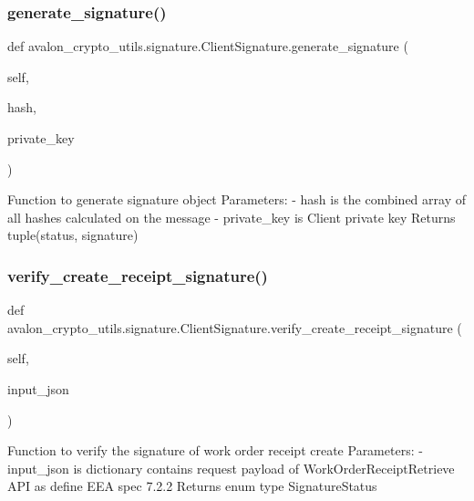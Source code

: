 \subsubsection{\texorpdfstring{generate\+\_\+signature()}{generate\_signature()}}
{\footnotesize\ttfamily def avalon\+\_\+crypto\+\_\+utils.\+signature.\+Client\+Signature.\+generate\+\_\+signature (\begin{DoxyParamCaption}\item[{}]{self,  }\item[{}]{hash,  }\item[{}]{private\+\_\+key }\end{DoxyParamCaption})}

\begin{DoxyVerb}Function to generate signature object
Parameters:
    - hash is the combined array of all hashes calculated on the
      message
    - private_key is Client private key
Returns tuple(status, signature)
\end{DoxyVerb}
 \mbox{\label{classavalon__crypto__utils_1_1signature_1_1ClientSignature_a322bfb1cd3cb921595d6d1860904ec43}} 
\subsubsection{\texorpdfstring{verify\+\_\+create\+\_\+receipt\+\_\+signature()}{verify\_create\_receipt\_signature()}}
{\footnotesize\ttfamily def avalon\+\_\+crypto\+\_\+utils.\+signature.\+Client\+Signature.\+verify\+\_\+create\+\_\+receipt\+\_\+signature (\begin{DoxyParamCaption}\item[{}]{self,  }\item[{}]{input\+\_\+json }\end{DoxyParamCaption})}

\begin{DoxyVerb}Function to verify the signature of work order receipt create
Parameters:
    - input_json is dictionary contains request payload of
      WorkOrderReceiptRetrieve API as define EEA spec 7.2.2
Returns enum type SignatureStatus
\end{DoxyVerb}
 \mbox{\label{classavalon__crypto__utils_1_1signature_1_1ClientSignature_a2d4afec5e477fd662e776d77efff432b}} 
